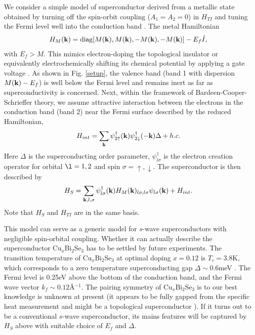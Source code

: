 We consider a simple model of superconductor derived from a metallic
state obtained by turning off the spin-orbit coupling ($A_1=A_2=0$) in
$H_{TI}$ and tuning the Fermi level well into the conduction band \cite{zhao}. The metal
Hamiltonian
\begin{eqnarray}
H_{M}({\bf k})=\mathrm{diag} [M({\bf k}), M({\bf k}), -M({\bf k}), -M({\bf k})]-E_f \hat{I},
\end{eqnarray}
with  $E_f>M$. 
This mimics electron-doping the topological insulator \cite{cu2} 
or equivalently electrochemically
shifting its chemical potential by applying a gate voltage \cite{gate}.
As shown in Fig. \ref{setup}, 
the valence band (band 1 with dispersion $M({\bf k})-E_f$) is well below the Fermi level and remains inert as far as 
superconductivity is concerned.  Next, within the framework of Bardeen-Cooper-Schrieffer
theory, we assume attractive interaction between
the electrons in the conduction band (band 2) near the Fermi surface described by the reduced
 Hamiltonian,
\begin{equation}
H_{int}=\sum_{\bf k} \psi^\dagger_{2\uparrow}({\bf k})\psi^\dagger_{2\downarrow}(-{\bf k})\Delta + h.c.
\end{equation}
Here $\Delta$ is the 
superconducting order parameter, $\psi^\dagger_{l\sigma}$ is the electron creation operator for orbital $\l=1,2$ and
spin $\sigma=\uparrow,\downarrow$. The superconductor is then described by 
\begin{equation}
H_S=\sum_{{\bf k},l,\sigma}\psi^\dagger_{l\sigma}({\bf k})H_M({\bf k})_{l\sigma,l\sigma}\psi_{l\sigma}({\bf k})+H_{int}.
\end{equation}
Note that $H_S$ and $H_{TI}$ are in the same 
basis.

This model can serve as a generic model for $s$-wave superconductors with negligible
spin-orbital coupling. Whether it can actually describe the superconductor Cu$_x$Bi$_2$Se$_3$
has to be settled by future experiments.
The transition temperature of Cu$_x$Bi$_2$Se$_3$ 
at optimal doping $x=0.12$ is $T_c=3.8$K, which corresponds to a zero 
temperature superconducting gap $\Delta\sim$0.6meV \cite{cu1,cu2,ando}. The Fermi level is 0.25eV 
above the bottom of the conduction band, and the Fermi wave vector $k_f\sim 0.12$\AA$^{-1}$.
The pairing symmetry of Cu$_x$Bi$_2$Se$_3$ is to our best knowledge is unknown at present (it appears
to be fully gapped from the specific heat measurement \cite{ando} and might be a 
topological superconductor \cite{cu2}). 
If it turns out to be a conventional $s$-wave superconductor, its mains 
features will be captured by $H_S$ above with suitable choice of $E_f$ and $\Delta$.

